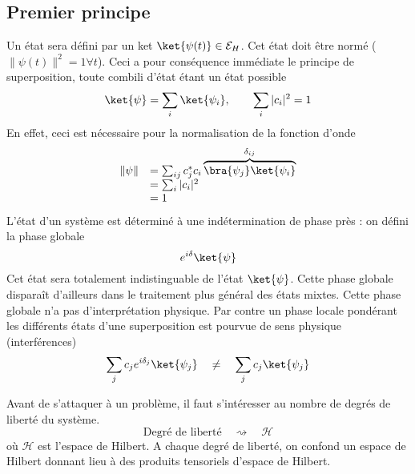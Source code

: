  \subsection{Premier principe}
 Un état sera défini par un ket $\ket{\psi(t)} \in \mathcal{E}_H$. Cet 
 état doit être normé ($\|\psi(t)\|^2 = 1 \forall t$). Ceci a pour 
 conséquence immédiate le principe de superposition, toute combili d'état 
 étant un état possible
 \begin{equation}
 \ket{\psi} = \sum_i\ket{\psi_i},\qquad \sum_i |c_i|^2 = 1
 \end{equation}
 En effet, ceci est nécessaire pour la normalisation de la fonction d'onde
 \begin{equation}
 \begin{array}{ll}
 \|\psi\| &= \sum_{ij} c_j^*c_i\overbrace{\bra{\psi_j}\ket{\psi_i}}^{\delta_{ij}}\\
 &= \sum_i |c_i|^2 \\
 &= 1
 \end{array}
 \end{equation}
 L'état d'un système est déterminé à une indétermination de phase près : on 
 défini la phase globale
 \begin{equation}
 e^{i\delta}\ket{\psi}
 \end{equation}
 Cet état sera totalement indistinguable de l'état $\ket{\psi}$. Cette phase 
 globale disparaît d'ailleurs dans le traitement plus général des états mixtes. 
 Cette phase globale n'a pas d'interprétation physique. Par contre un phase 
 locale pondérant les différents états d'une superposition est pourvue de 
 sens physique (interférences)
 \begin{equation}
 \sum_j c_je^{i\delta_j}\ket{\psi_j}\quad\neq\quad \sum_j c_j\ket{\psi_j}
 \end{equation}
 
 Avant de s'attaquer à un problème, il faut s'intéresser au nombre de 
 degrés de liberté du système.
 \begin{equation}
 \text{Degré de liberté}\quad \rightsquigarrow\quad \mathcal{H}
 \end{equation}
 où $\mathcal{H}$ est l'espace de Hilbert. A chaque degré de liberté, on 
 confond un espace de Hilbert donnant lieu à des produits tensoriels d'espace 
 de Hilbert.
 
